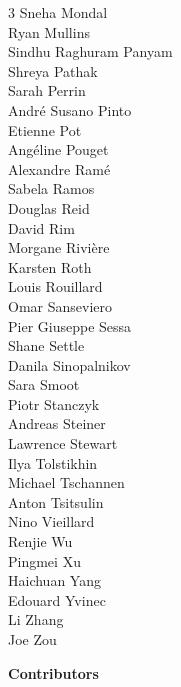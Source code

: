 \begin{multicols}{3}
Sneha Mondal \\ 
Ryan Mullins \\ 
Sindhu Raghuram Panyam \\ 
Shreya Pathak \\ 
Sarah Perrin \\
André Susano Pinto \\ 
Etienne Pot \\ 
Angéline Pouget \\ 
Alexandre Ramé \\ 
Sabela Ramos \\ 
Douglas Reid \\ 
David Rim \\ 
Morgane Rivière \\ 
Karsten Roth \\ 
Louis Rouillard \\
Omar Sanseviero \\
Pier Giuseppe Sessa \\ 
Shane Settle \\ 
Danila Sinopalnikov \\ 
Sara Smoot \\ 
Piotr Stanczyk \\ 
Andreas Steiner \\ 
Lawrence Stewart \\ 
Ilya Tolstikhin \\ 
Michael Tschannen \\ 
Anton Tsitsulin \\ 
Nino Vieillard \\ 
Renjie Wu \\ 
Pingmei Xu \\ 
Haichuan Yang \\ 
Edouard Yvinec \\ 
Li Zhang \\ 
Joe Zou \\
\end{multicols}

\noindent\textbf{Contributors} \\

